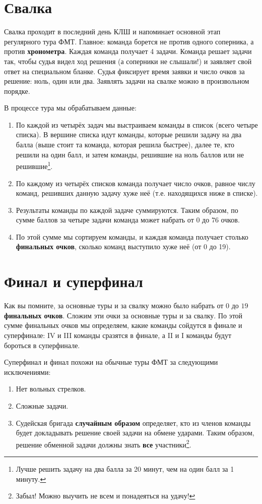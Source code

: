 \documentclass[12pt]{article}
\begin{document}
\section*{Свалка}
Свалка проходит в последний день КЛШ и напоминает основной этап регулярного тура ФМТ. Главное: команда борется не против одного соперника, а против {\bf хронометра}. Каждая команда получает 4 задачи. Команда решает задачи так, чтобы судья видел ход решения (а соперники не слышали!) и заявляет свой ответ на специальном бланке. Судья фиксирует время заявки и число очков за решение: ноль, один или два. Заявлять задачи на свалке можно в произвольном порядке.

В процессе тура мы обрабатываем данные:
\begin{enumerate}
\item По каждой из четырёх задач мы выстраиваем команды в список (всего четыре списка). В вершине списка идут команды, которые решили задачу на два балла (выше стоит та команда, которая решила быстрее), далее те, кто решили на один балл, и затем команды, решившие на ноль баллов или не решившие\footnote{Лучше решить задачу на два балла за 20 минут, чем на один балл за 1 минуту.}.
\item По каждому из четырёх списков команда получает число очков, равное числу команд, решивших данную задачу хуже неё (т.е. находящихся ниже в списке). 
\item Результаты команды по каждой задаче суммируются. Таким образом, по сумме баллов за четыре задачи команда может набрать от $0$ до $76$ очков.
\item По этой сумме мы сортируем команды, и каждая команда получает столько {\bf финальных очков}, сколько команд выступило хуже неё (от 0 до 19).
\end{enumerate}

\section*{Финал и суперфинал}
Как вы помните, за основные туры и за свалку можно было набрать от $0$ до $19$ {\bf финальных очков}. Сложим эти очки за основные туры и за свалку. По этой сумме финальных очков мы определяем, какие команды сойдутся в финале и суперфинале: IV и III команды сразятся в финале, а II и I команды будут бороться в суперфинале.

Суперфинал и финал похожи на обычные туры ФМТ за следующими исключениями:
\begin{enumerate}
\item Нет вольных стрелков.
\item Сложные задачи.
\item Судейская бригада {\bf случайным образом} определяет, кто из членов команды будет докладывать решение своей задачи на обмене ударами. Таким образом, решение обменной задачи должны знать {\bf все} участники\footnote{Забыл! Можно выучить не всем и понадеяться на удачу!}.
\end{enumerate}
\end{document}
